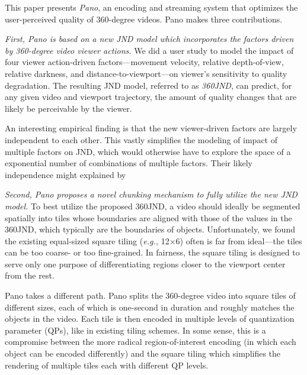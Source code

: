 \documentclass[sigconf]{acmart}
\newcommand{\jc}[1]{{\color{blue}{[JC: #1]}}}
\newcommand{\name}{{Pano}\xspace}
\newcommand{\vrjnd}{{360JND}\xspace}
\newcommand{\eg}{{\it e.g.,}\xspace}
\begin{document}
This paper presents {\em \name}, an encoding and streaming system that optimizes the user-perceived quality of 360-degree videos. 
\name makes three contributions.

\vspace{0.2cm}
{\em First, \name is based on a new JND model which incorporates the factors driven by 360-degree video viewer actions.}
We did a user study to model the impact of four viewer action-driven factors---movement velocity, relative depth-of-view, relative darkness, and distance-to-viewport---on viewer's sensitivity to quality degradation.
The resulting JND model, referred to as {\em \vrjnd}, can predict, for any given video and viewport trajectory, the amount of quality changes  that are likely be perceivable by the viewer.

An interesting empirical finding is that the new viewer-driven factors are largely independent to each other.
This vastly simplifies the modeling of impact of multiple factors on JND, which would otherwise have to explore the space of a exponential number of combinations of multiple factors.
Their likely independence might explained by \jc{what's the intuition here?}


\vspace{0.2cm}
{\em Second, \name proposes a novel chunking mechanism to fully utilize the new JND model.}
To best utilize the proposed \vrjnd,  a video should ideally be segmented spatially into tiles whose boundaries are aligned with those of the values in the \vrjnd, which typically are the boundaries of objects.
Unfortunately, we found the existing equal-sized square tiling (\eg 12$\times$6) often is far from ideal---the tiles can be too coarse- or too fine-grained. 
In fairness, the square tiling is designed to serve only one purpose of differentiating regions closer to the viewport center from the rest.

\name takes a different path. 
\name splits the 360-degree video into square tiles of different sizes, each of which is one-second in duration and roughly matches the objects in the video. Each tile is then encoded in multiple levels of quantization parameter (QPs), like in existing tiling schemes.
In some sense, this is a compromise between the more radical region-of-interest encoding (in which each object can be encoded differently) and the square tiling which simplifies the rendering of multiple tiles each with different QP levels.
\end{document}
